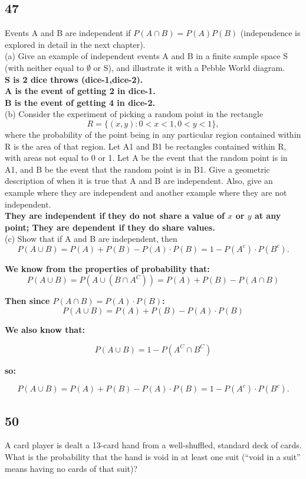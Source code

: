 \documentclass{article}
\begin{document}
 \subsection{47}
 Events A and B are independent if $P(A\cap B) = P(A)P(B)$ (independence is explored in detail in the next chapter).\\
(a) Give an example of independent events A and B in a ﬁnite sample space S (with neither equal to $\emptyset$ or S), and illustrate it with a Pebble World diagram.\\
\textbf{S is 2 dice throws (dice-1,dice-2).\\
A is the event of getting 2 in dice-1.\\
B is the event of getting 4 in dice-2.}\\ (b) Consider the experiment of picking a random point in the rectangle $$R = \{(x,y) : 0 < x < 1,0 < y < 1\},$$ where the probability of the point being in any particular region contained within R is the area of that region. Let A1 and B1 be rectangles contained within R, with areas not equal to 0 or 1. Let A be the event that the random point is in A1, and B be the event that the random point is in B1. Give a geometric description of when it is true that A and B are independent. Also, give an example where they are independent and another example where they are not independent.\\
\textbf{They are independent if they do not share a value of $x$ or $y$ at any point; They are dependent if they do share values.}\\
(c) Show that if A and B are independent, then $$P(A \cup B) = P(A) + P(B)-P(A) \cdot P(B) = 1-P(A^c) \cdot P(B^c).$$

\textbf{We know from the properties of probability that: }
$$P(A \cup B) = P (A \cup (B \cap A ^C))= P(A) + P (B) - P (A \cap B)$$


\textbf{Then since $P(A\cap B) = P(A) \cdot P(B)$:}
$$ P(A \cup B) = P (A ) + P (B) - P(A) \cdot P(B)$$

\textbf{We also know that: }

$$P(A \cup B)= 1 - P(A^C \cap B ^C)$$

\textbf{so:}

$$P(A \cup B) = P(A) + P(B)-P(A) \cdot P(B) = 1-P(A^c) \cdot P(B^c).$$
\subsection{50}
A card player is dealt a 13-card hand from a well-shuﬄed, standard deck of cards. What is the probability that the hand is void in at least one suit (“void in a suit” means having no cards of that suit)?
\end{document}
